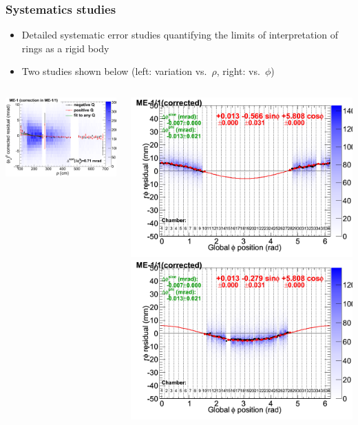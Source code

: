 \documentclass[compress]{beamer}
\begin{document}
\begin{frame}
\frametitle{Systematics studies}

\begin{itemize}
\item Detailed systematic error studies quantifying the limits of
  interpretation of rings as a rigid body
\item Two studies shown below (left: variation vs.\ $\rho$, right:
  vs.\ $\phi$)
\end{itemize}

\vfill
\begin{columns}
\includegraphics[width=\linewidth]{vsmomentum_correction.png}

\includegraphics[width=0.5\linewidth]{vsphi_systematic1.png}
\includegraphics[width=0.5\linewidth]{vsphi_systematic2.png}


\end{columns}
\end{frame}
\end{document}
